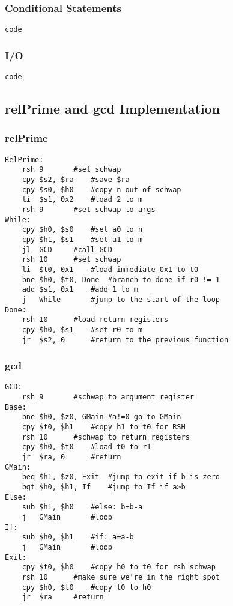 \documentclass{article}
\begin{document}
		\subsubsection{Conditional Statements}
			\begin{lstlisting}[frame=single]
code
			\end{lstlisting}
		\subsubsection{I/O}
			\begin{lstlisting}[frame=single]
code
			\end{lstlisting}
	\subsection{relPrime and gcd Implementation}
		\subsubsection{relPrime}
			\begin{lstlisting}[frame=single]
RelPrime:	
	rsh	9		#set schwap
	cpy	$s2, $ra	#save $ra
	cpy	$s0, $h0	#copy n out of schwap
	li	$s1, 0x2	#load 2 to m
	rsh	9		#set schwap to args
While:
	cpy	$h0, $s0	#set a0 to n
	cpy	$h1, $s1	#set a1 to m
	jl	GCD		#call GCD
	rsh	10		#set schwap
	li	$t0, 0x1	#load immediate 0x1 to t0
	bne	$h0, $t0, Done	#branch to done if r0 != 1
	add	$s1, 0x1	#add 1 to m
	j	While		#jump to the start of the loop
Done:
	rsh	10		#load return registers
	cpy	$h0, $s1	#set r0 to m
	jr	$s2, 0		#return to the previous function
			\end{lstlisting}
		\subsubsection{gcd}
			\begin{lstlisting}[frame=single]
GCD:
	rsh	9		#schwap to argument register
Base:
	bne	$h0, $z0, GMain	#a!=0 go to GMain
	cpy	$t0, $h1	#copy h1 to t0 for RSH
	rsh	10		#schwap to return registers
	cpy	$h0, $t0	#load t0 to r1
	jr	$ra, 0		#return
GMain:	
	beq	$h1, $z0, Exit	#jump to exit if b is zero
	bgt	$h0, $h1, If	#jump to If if a>b
Else:	
	sub	$h1, $h0	#else: b=b-a
	j	GMain		#loop
If:	
	sub	$h0, $h1	#if: a=a-b
	j	GMain		#loop
Exit:
	cpy	$t0, $h0	#copy h0 to t0 for rsh schwap
	rsh	10		#make sure we're in the right spot
	cpy	$h0, $t0	#copy t0 to h0
	jr	$ra		#return
			\end{lstlisting}
\end{document}
